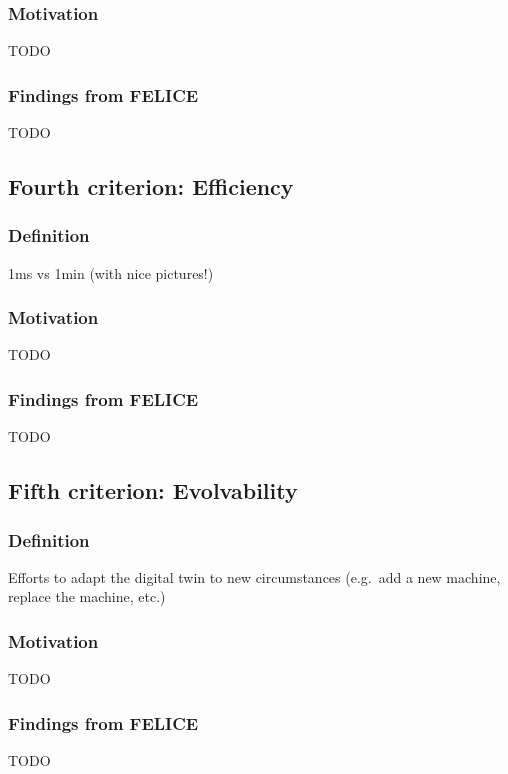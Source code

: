 \documentclass[9pt,conference]{IEEEtran}
\begin{document}
    \subsubsection{Motivation}
    TODO

    \subsubsection{Findings from FELICE}
    TODO

    \subsection{Fourth criterion: Efficiency}
    
    \subsubsection{Definition}
    1ms vs 1min (with nice pictures!)

    \subsubsection{Motivation}
    TODO

    \subsubsection{Findings from FELICE}
    TODO

    \subsection{Fifth criterion: Evolvability}
    
    \subsubsection{Definition}
    Efforts to adapt the digital twin to new circumstances (e.g.\ add a new machine, replace the machine, etc.)

    \subsubsection{Motivation}
    TODO

    \subsubsection{Findings from FELICE}
    TODO

 
\end{document}
